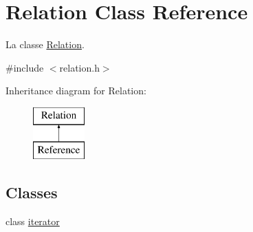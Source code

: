 \hypertarget{classRelation}{}\section{Relation Class Reference}
\label{classRelation}


La classe \hyperlink{classRelation}{Relation}.  




{\ttfamily \#include $<$relation.\+h$>$}

Inheritance diagram for Relation\+:\begin{figure}[H]
\begin{center}
\leavevmode
\includegraphics[height=2.000000cm]{classRelation}
\end{center}
\end{figure}
\subsection*{Classes}
\begin{DoxyCompactItemize}
\item 
class \hyperlink{classRelation_1_1iterator}{iterator}
\end{DoxyCompactItemize}
